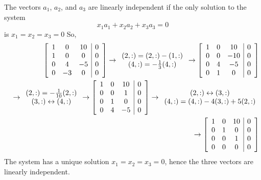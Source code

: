 \vspace{2mm}
The vectors $a_1$, $a_2$, and $a_3$ are linearly independent if the only solution to the system
$$
x_1a_1 + x_2a_2 + x_3a_3 = 0
$$
is $x_1=x_2=x_3=0$
So,
\begin{eqnarray*}
&&\left[\begin{array}{ccc|c}1&0&10&0\\1&0&0&0\\0&4&-5&0\\0&-3&0&0\end{array}\right]\rightarrow \begin{array}{c}(2,:)=(2,:)-(1,:)\\(4,:)=-\frac{1}{3}(4,:)\end{array}\rightarrow
\left[\begin{array}{ccc|c}1&0&10&0\\0&0&-10&0\\0&4&-5&0\\0&1&0&0\end{array}\right]\\&&\rightarrow
\begin{array}{c}(2,:)=-\frac{1}{10}(2,:)\\(3,:)\leftrightarrow(4,:)\end{array}\rightarrow
\left[\begin{array}{ccc|c}1&0&10&0\\0&0&1&0\\0&1&0&0\\0&4&-5&0\end{array}\right]\rightarrow
\begin{array}{c}(2,:)\leftrightarrow(3,:)\\(4,:)=(4,:)-4(3,:)+5(2,:)\end{array}\\&&\rightarrow
\left[\begin{array}{ccc|c}1&0&10&0\\0&1&0&0\\0&0&1&0\\0&0&0&0\end{array}\right]
\end{eqnarray*}
The system has a unique solution $x_1=x_2=x_3=0$, hence the three vectors are linearly independent.

